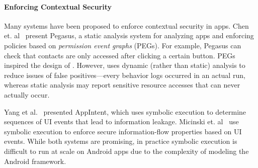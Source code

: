 



\paragraph*{Enforcing Contextual Security}
Many systems have been proposed to enforce contextual security in
apps.  Chen et. al~\cite{Chen:13} present Pegasus, a static analysis
system for analyzing apps and enforcing policies based on
\emph{permission event graphs} (PEGs). For example, Pegasus can check
that contacts are only accessed after clicking a certain
button. PEGs inspired the design of \apptracer{}. However, \apptracer{}
uses dynamic (rather than static) analysis to reduce issues of false
positives---every behavior \apptracer{} logs occurred in an actual run,
whereas static analysis may report sensitive resource accesses that can never actually occur.


Yang et al.~\cite{Yang:2013} presented AppIntent, which uses symbolic
execution to determine sequences of UI events that lead to information
leakage. Micinski et. al~\cite{Micinski:2015} use symbolic execution
to enforce secure information-flow properties based on UI
events. While both systems are promising, in practice symbolic
execution is difficult to run at scale on Android apps due to the
complexity of modeling the Android framework.

